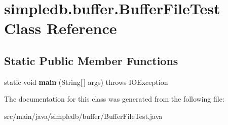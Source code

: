 \hypertarget{classsimpledb_1_1buffer_1_1BufferFileTest}{}\section{simpledb.\+buffer.\+Buffer\+File\+Test Class Reference}
\label{classsimpledb_1_1buffer_1_1BufferFileTest}
\subsection*{Static Public Member Functions}
\begin{DoxyCompactItemize}
\item 
\mbox{\label{classsimpledb_1_1buffer_1_1BufferFileTest_aa6d5482c41166e42d4d5413fba5d3cd7}} 
static void {\bfseries main} (String\mbox{[}$\,$\mbox{]} args)  throws I\+O\+Exception 
\end{DoxyCompactItemize}


The documentation for this class was generated from the following file\+:\begin{DoxyCompactItemize}
\item 
src/main/java/simpledb/buffer/Buffer\+File\+Test.\+java\end{DoxyCompactItemize}

